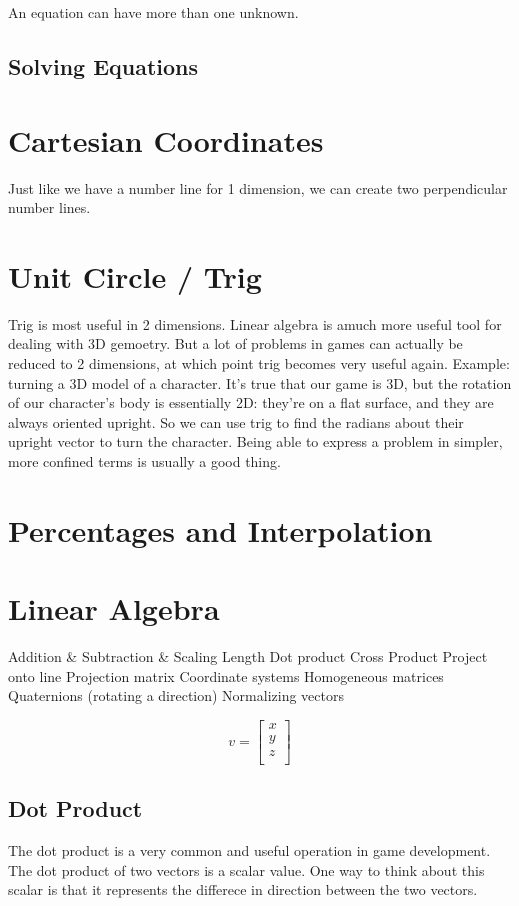 \documentclass[11pt]{article}
\begin{document}
An equation can have more than one unknown. 

\subsection{Solving Equations}
\label{sec-5-1}
\section{Cartesian Coordinates}
\label{sec-6}
Just like we have a number line for 1 dimension, we can create two perpendicular number lines.
\section{Unit Circle / Trig}
\label{sec-7}
Trig is most useful in 2 dimensions. Linear algebra is amuch more useful tool for dealing with 3D gemoetry. But a lot of problems in games can actually be reduced to 2 dimensions, at which point trig becomes very useful again. Example: turning a 3D model of a character. It's true that our game is 3D, but the rotation of our character's body is essentially 2D: they're on a flat surface, and they are always oriented upright. So we can use trig to find the radians about their upright vector to turn the character. Being able to express a problem in simpler, more confined terms is usually a good thing. 
\section{Percentages and Interpolation}
\label{sec-8}
\section{Linear Algebra}
\label{sec-9}
Addition \& Subtraction \& Scaling
Length
Dot product
Cross Product
Project onto line
Projection matrix
Coordinate systems
Homogeneous matrices
Quaternions (rotating a direction)
Normalizing vectors

\begin{equation*}
  v = 
  \begin{bmatrix}
  x \\
  y \\
  z \\
  \end{bmatrix}
\end{equation*}



\subsection{Dot Product}
\label{sec-9-1}
The dot product is a very common and useful operation in game development. The dot product of two vectors is a scalar value. One way to think about this scalar is that it represents the differece in direction between the two vectors.
\end{document}
